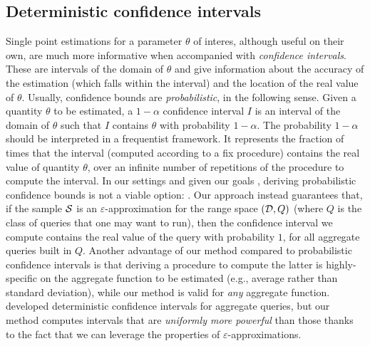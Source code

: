 
\subsection{Deterministic confidence intervals}\label{sec:confint}
Single point estimations for a parameter $\theta$ of interes, although useful on
their own, are much more informative when accompanied with \emph{confidence
intervals}. These are intervals of the domain of $\theta$ and give information
about the accuracy of the estimation (which falls within the interval) and the
location of the real value of $\theta$. Usually, confidence bounds are
\emph{probabilistic}, in the following sense. Given a quantity $\theta$ to be
estimated, a $1-\alpha$ confidence interval $I$ is an interval of the domain of
$\theta$ such that $I$ contains $\theta$ with probability $1-\alpha$. The
probability $1-\alpha$ should be interpreted in a frequentist framework. It
represents the fraction of times that the interval (computed according to a fix
procedure) contains the real value of quantity $\theta$, over an infinite number
of repetitions of the procedure to compute the
interval. In our settings and given our goals , deriving probabilistic confidence bounds is not a viable
option: . Our approach instead guarantees that, if the sample ${\cal S}$ is an
$\varepsilon$-approximation for the range space $({\cal D},Q)$ (where $Q$ is the
class of queries that one may want to run), then the confidence interval we
compute contains the real value of the query with probability $1$, for all
aggregate queries built in $Q$. Another advantage of our method compared to
probabilistic confidence intervals is that deriving a procedure to compute the
latter is highly-specific on the aggregate function to be estimated (e.g.,
average rather than standard deviation), while our method is valid for
\emph{any} aggregate function. \citet{Haas96} developed deterministic confidence
intervals for aggregate queries, but our method computes intervals that are
\emph{uniformly more powerful} than those thanks to the fact that we can
leverage the properties of
$\varepsilon$-approximations.

